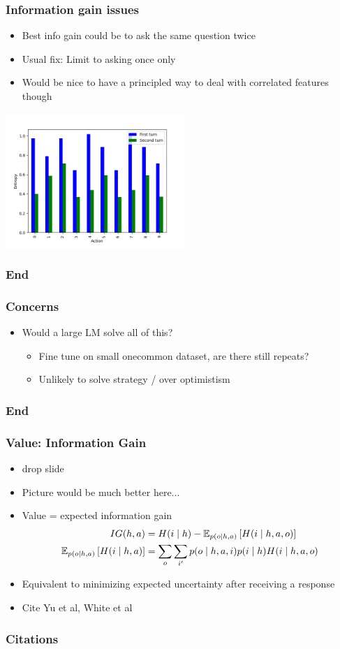 \documentclass{beamer}
\begin{document}
\begin{frame}
\frametitle{Information gain issues}
\begin{itemize}
\item Best info gain could be to ask the same question twice
\item Usual fix: Limit to asking once only
\item Would be nice to have a principled way to deal with correlated
    features though
\end{itemize}
\centering
\includegraphics[height=2in]{src/entropy.png}
\end{frame}

\begin{frame}
\frametitle{End}
\end{frame}


\begin{frame}
\frametitle{Concerns}
\begin{itemize}
\item Would a large LM solve all of this?
    \begin{itemize}
    \item Fine tune on small onecommon dataset, are there still repeats?
    \item Unlikely to solve strategy / over optimistism
    \end{itemize}
\end{itemize}
\end{frame}

\begin{frame}
\frametitle{End}
\end{frame}


\begin{frame}
\frametitle{Value: Information Gain}
\begin{itemize}
\item drop slide
\item Picture would be much better here...
\item Value = expected information gain
\begin{align*}
IG(h, a) &= H(i \mid h) - \mathbb{E}_{p(o\mid h,a)}\left[H(i \mid h, a, o)\right]\\
\mathbb{E}_{p(o\mid h,a)}\left[H(i \mid h, a)\right] &= \sum_o\sum_{i'}p(o\mid h,a,i)p(i\mid h)H(i \mid h,a,o)
\end{align*}
\item Equivalent to minimizing expected uncertainty after receiving a response
\item Cite Yu et al, White et al
\end{itemize}
\end{frame}

\begin{frame}[allowframebreaks]
\frametitle{Citations}

\end{frame}
\end{document}
